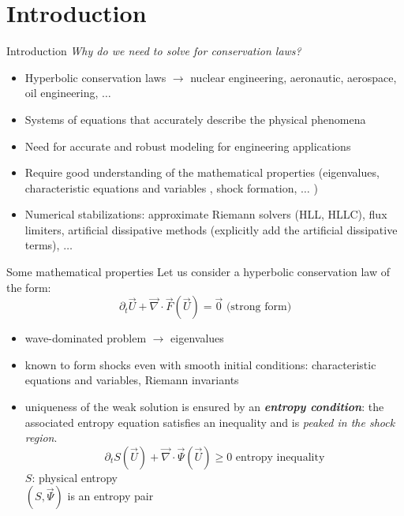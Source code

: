 \documentclass[xcolor=dvipsnames,10pt]{beamer}
\renewcommand{\div}{\vec{\nabla}\! \cdot \!}
\newcommand{\tcr}[1]{\textcolor{red}{#1}}
\begin{document}
\section{Introduction}
\begin{frame}{Introduction}
\emph{Why do we need to solve for conservation laws?}
\begin{block}{}
\begin{itemize}
\setlength{\itemsep}{10pt}
\item Hyperbolic conservation laws $\longrightarrow$ nuclear engineering, aeronautic, aerospace, oil engineering, $\dots$
\item Systems of equations that accurately describe the physical phenomena
\item Need for accurate and robust modeling for engineering applications
\item Require good understanding of the mathematical properties (eigenvalues, characteristic equations and variables , shock formation, $\dots$ )
\item Numerical stabilizations: approximate Riemann solvers (HLL, HLLC), flux limiters, artificial dissipative methods (explicitly add the artificial dissipative terms), $\dots$
\end{itemize}
\end{block}
\end{frame}
\begin{frame}{Some mathematical properties}
Let us consider a hyperbolic conservation law of the form:
\begin{equation} \partial_t \vec{U} + \div \vec{F} ( \vec{U} ) = \vec{0}  \nonumber \text{ (strong form)}\end{equation} 
\begin{itemize}
\item wave-dominated problem $\to$ eigenvalues
\item known to form shocks even with smooth initial conditions: characteristic equations and variables, Riemann invariants
\item uniqueness of the weak solution is ensured by an \textbf{\emph{entropy condition}}: the associated entropy equation satisfies an inequality and is \emph{peaked in the shock region}.
\begin{equation}
\partial_t S ( \vec{U} ) + \div \vec{\Psi} ( \vec{U} ) \geq 0 \text{ entropy inequality} \nonumber
\end{equation}
$S$: physical entropy \\
$\left( S, \vec{\Psi} \right)$ is an entropy pair
\end{itemize}
\end{frame}
\end{document}
